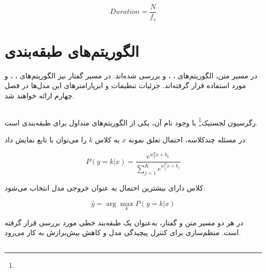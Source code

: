 \begin{equation}
Duration
=
\frac{N}{f_s}
\end{equation}


\section{الگوریتم‌های طبقه‌بندی}

در مسیر متن، الگوریتم‌های
،
،
و
بررسی شده‌اند. در مسیر گفتار نیز الگوریتم‌های
،
،
و
مورد استفاده قرار گرفته‌اند. جزئیات تنظیمات و ابرپارامترهای این مدل‌ها در فصل چهارم ارائه خواهند شد.


\subsection{}

رگرسیون لجستیک\footnote{} با وجود نام آن، یکی از الگوریتم‌های متداول برای طبقه‌بندی است.

در مسئله چندکلاسه، احتمال تعلق نمونه $x$ به کلاس $k$ را می‌توان با تابع
نمایش داد:

\begin{equation}
P(y=k|x)
=
\frac{
e^{w_k^Tx+b_k}
}{
\sum_{j=1}^{K}
e^{w_j^Tx+b_j}
}
\end{equation}

کلاس دارای بیشترین احتمال به عنوان خروجی مدل انتخاب می‌شود:

\begin{equation}
\hat{y}
=
\arg\max_k
P(y=k|x)
\end{equation}

در هر دو مسیر متن و گفتار،
به‌عنوان یک طبقه‌بند خطی مورد بررسی قرار گرفته است. منظم‌سازی برای کنترل پیچیدگی مدل و کاهش بیش‌برازش به کار می‌رود.


\subsection{}


